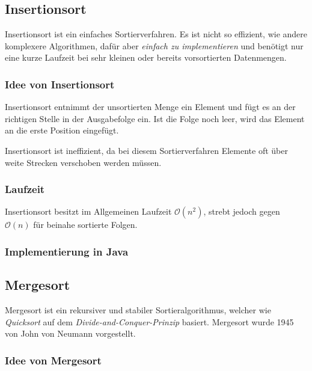 \documentclass[german]{pfBook}
\newcommand{\OO}{\mathcal{O}}
\begin{document}
	
	
	\subsection{Insertionsort}
	
	Insertionsort ist ein einfaches Sortierverfahren. Es ist nicht so effizient, wie andere komplexere Algorithmen, dafür aber \emph{einfach zu implementieren} und benötigt nur eine kurze Laufzeit bei sehr kleinen oder bereits vorsortierten Datenmengen.
	
	\subsubsection{Idee von Insertionsort}
	
	Insertionsort entnimmt der unsortierten Menge ein Element und fügt es an der richtigen Stelle in der Ausgabefolge ein. Ist die Folge noch leer, wird das Element an die erste Position eingefügt.
	
	Insertionsort ist ineffizient, da bei diesem Sortierverfahren Elemente oft über weite Strecken verschoben werden müssen.
	
	\subsubsection{Laufzeit}
	
	Insertionsort besitzt im Allgemeinen Laufzeit $\OO(n^2)$, strebt jedoch gegen $\OO(n)$ für beinahe sortierte Folgen.
	
	\subsubsection{Implementierung in Java}
	
	
	
	\subsection{Mergesort}
	
	Mergesort ist ein rekursiver und stabiler Sortieralgorithmus, welcher wie \emph{Quicksort} auf dem \emph{Divide-and-Conquer-Prinzip} basiert. Mergesort wurde 1945 von John von Neumann vorgestellt.
	
	\subsubsection{Idee von Mergesort}
	
\end{document}
